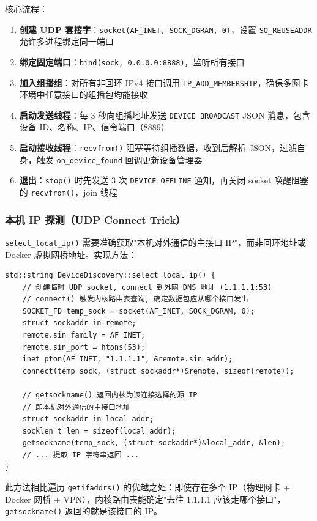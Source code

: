 \documentclass[12pt]{article}
\begin{document}
核心流程：

\begin{enumerate}
    \item \textbf{创建 UDP 套接字}：\texttt{socket(AF\_INET, SOCK\_DGRAM, 0)}，设置 \texttt{SO\_REUSEADDR} 允许多进程绑定同一端口
    \item \textbf{绑定固定端口}：\texttt{bind(sock, 0.0.0.0:8888)}，监听所有接口
    \item \textbf{加入组播组}：对所有非回环 IPv4 接口调用 \texttt{IP\_ADD\_MEMBERSHIP}，确保多网卡环境中任意接口的组播包均能接收
    \item \textbf{启动发送线程}：每 3 秒向组播地址发送 \texttt{DEVICE\_BROADCAST} JSON 消息，包含设备 ID、名称、IP、信令端口（8889）
    \item \textbf{启动接收线程}：\texttt{recvfrom()} 阻塞等待组播数据，收到后解析 JSON，过滤自身，触发 \texttt{on\_device\_found} 回调更新设备管理器
    \item \textbf{退出}：\texttt{stop()} 时先发送 3 次 \texttt{DEVICE\_OFFLINE} 通知，再关闭 socket 唤醒阻塞的 \texttt{recvfrom()}，join 线程
\end{enumerate}

\subsubsection{本机 IP 探测（UDP Connect Trick）}

\texttt{select\_local\_ip()} 需要准确获取"本机对外通信的主接口 IP"，而非回环地址或 Docker 虚拟网桥地址。实现方法：

\begin{lstlisting}[caption={本机IP探测 (device\_discovery.cpp)}]
std::string DeviceDiscovery::select_local_ip() {
    // 创建临时 UDP socket, connect 到外网 DNS 地址 (1.1.1.1:53)
    // connect() 触发内核路由表查询, 确定数据包应从哪个接口发出
    SOCKET_FD temp_sock = socket(AF_INET, SOCK_DGRAM, 0);
    struct sockaddr_in remote;
    remote.sin_family = AF_INET;
    remote.sin_port = htons(53);
    inet_pton(AF_INET, "1.1.1.1", &remote.sin_addr);
    connect(temp_sock, (struct sockaddr*)&remote, sizeof(remote));

    // getsockname() 返回内核为该连接选择的源 IP
    // 即本机对外通信的主接口地址
    struct sockaddr_in local_addr;
    socklen_t len = sizeof(local_addr);
    getsockname(temp_sock, (struct sockaddr*)&local_addr, &len);
    // ... 提取 IP 字符串返回 ...
}
\end{lstlisting}

此方法相比遍历 \texttt{getifaddrs()} 的优越之处：即使存在多个 IP（物理网卡 + Docker 网桥 + VPN），内核路由表能确定"去往 1.1.1.1 应该走哪个接口"，\texttt{getsockname()} 返回的就是该接口的 IP。
\end{document}
